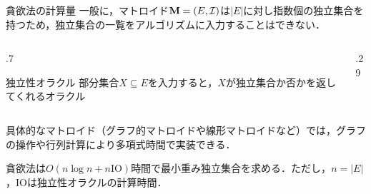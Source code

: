 \documentclass[14pt,aspectratio=169,xcolor=dvipsnames,table,onlytextwidth,dvipdfmx]{beamer}
\begin{document}
\begin{frame}{貪欲法の計算量}
    \small
    一般に，マトロイド$\mathbf{M} = (E, \mathcal{I})$は$|E|$に対し指数個の独立集合を持つため，独立集合の一覧をアルゴリズムに入力することはできない．

    \begin{columns}
    \begin{column}{.7\textwidth}
    \begin{block}{独立性オラクル}
        部分集合$X \subseteq E$を入力すると，$X$が独立集合か否かを返してくれるオラクル
    \end{block}
    \end{column}
    \begin{column}{.29\textwidth}
        \centering
    \end{column}
    \end{columns}
    \smallskip
    具体的なマトロイド（グラフ的マトロイドや線形マトロイドなど）では，グラフの操作や行列計算により多項式時間で実装できる．

    \pause
    \bigskip
    \begin{theorem}
        貪欲法は$O(n \log n + n \mathrm{IO})$時間で最小重み独立集合を求める．ただし，$n = |E|$，$\mathrm{IO}$は独立性オラクルの計算時間．
    \end{theorem}
\end{frame}


\end{document}
